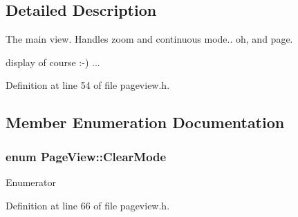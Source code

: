 \subsection{Detailed Description}
The main view. Handles zoom and continuous mode.. oh, and page. 

display of course \+:-\/) ... 

Definition at line 54 of file pageview.\+h.



\subsection{Member Enumeration Documentation}
\hypertarget{classPageView_a94ded93353c47276bfadb5ffc428a892}{
\subsubsection[{Clear\+Mode}]{\setlength{\rightskip}{0pt plus 5cm}enum {\bf Page\+View\+::\+Clear\+Mode}}}\label{classPageView_a94ded93353c47276bfadb5ffc428a892}
\begin{Desc}
\item[Enumerator]\par
\begin{description}
\item[{\em 
\hypertarget{classPageView_a94ded93353c47276bfadb5ffc428a892acaa9219255254867e6ca9e31dff8fb8e}{Clear\+All\+Selection}\label{classPageView_a94ded93353c47276bfadb5ffc428a892acaa9219255254867e6ca9e31dff8fb8e}
}]\item[{\em 
\hypertarget{classPageView_a94ded93353c47276bfadb5ffc428a892af8bc77b79de50cd32e76617e7f471354}{Clear\+Only\+Dividers}\label{classPageView_a94ded93353c47276bfadb5ffc428a892af8bc77b79de50cd32e76617e7f471354}
}]\end{description}
\end{Desc}


Definition at line 66 of file pageview.\+h.


